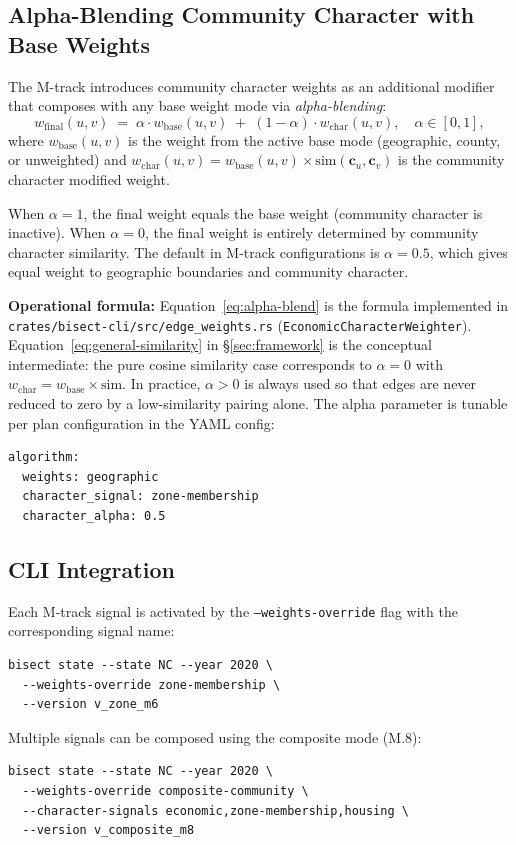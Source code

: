\subsection{Alpha-Blending Community Character with Base Weights}

The M-track introduces community character weights as an additional modifier that
composes with any base weight mode via \emph{alpha-blending}:
\begin{equation}
  w_{\mathrm{final}}(u,v)
  \;=\;
  \alpha \cdot w_{\mathrm{base}}(u,v)
  \;+\;
  (1 - \alpha) \cdot w_{\mathrm{char}}(u,v),
  \quad \alpha \in [0,1],
  \label{eq:alpha-blend}
\end{equation}
where $w_{\mathrm{base}}(u,v)$ is the weight from the active base mode
(geographic, county, or unweighted) and
$w_{\mathrm{char}}(u,v) = w_{\mathrm{base}}(u,v) \times \mathrm{sim}(\mathbf{c}_u, \mathbf{c}_v)$
is the community character modified weight.

When $\alpha = 1$, the final weight equals the base weight (community character
is inactive).
When $\alpha = 0$, the final weight is entirely determined by community character
similarity.
The default in M-track configurations is $\alpha = 0.5$, which gives equal weight
to geographic boundaries and community character.

\textbf{Operational formula:} Equation~\ref{eq:alpha-blend} is the formula
implemented in \texttt{crates/bisect-cli/src/edge\_weights.rs}
(\texttt{EconomicCharacterWeighter}). Equation~\ref{eq:general-similarity} in
\S\ref{sec:framework} is the conceptual intermediate: the pure cosine similarity
case corresponds to $\alpha = 0$ with $w_{\mathrm{char}} = w_{\mathrm{base}} \times \mathrm{sim}$.
In practice, $\alpha > 0$ is always used so that edges are never reduced to zero
by a low-similarity pairing alone.
The alpha parameter is tunable per plan configuration in the YAML config:
\begin{verbatim}
algorithm:
  weights: geographic
  character_signal: zone-membership
  character_alpha: 0.5
\end{verbatim}

\subsection{CLI Integration}

Each M-track signal is activated by the \texttt{--weights-override} flag with the
corresponding signal name:
\begin{verbatim}
bisect state --state NC --year 2020 \
  --weights-override zone-membership \
  --version v_zone_m6
\end{verbatim}
Multiple signals can be composed using the composite mode (M.8):
\begin{verbatim}
bisect state --state NC --year 2020 \
  --weights-override composite-community \
  --character-signals economic,zone-membership,housing \
  --version v_composite_m8
\end{verbatim}

